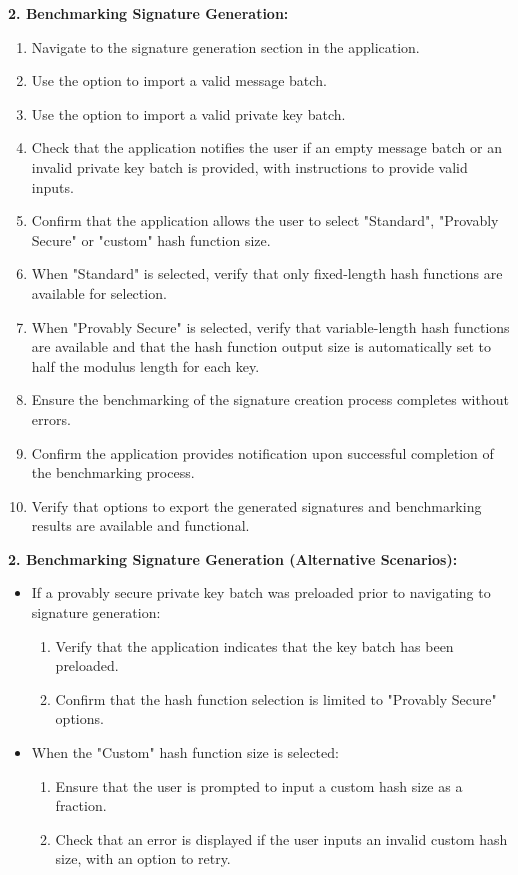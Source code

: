 \documentclass[]{final_report}
\theoremstyle{definition}
\begin{document}
\textbf{2. Benchmarking Signature Generation:}
\begin{enumerate}
    \item Navigate to the signature generation section in the application.
    \item Use the option to import a valid message batch.
    \item Use the option to import a valid private key batch.
    \item Check that the application notifies the user if an empty message batch or an invalid private key batch is provided, with instructions to provide valid inputs.
    \item Confirm that the application allows the user to select "Standard", "Provably Secure" or "custom" hash function size.
    \item When "Standard" is selected, verify that only fixed-length hash functions are available for selection.
    \item When "Provably Secure" is selected, verify that variable-length hash functions are available and that the hash function output size is automatically set to half the modulus length for each key.
    \item Ensure the benchmarking of the signature creation process completes without errors.
    \item Confirm the application provides notification upon successful completion of the benchmarking process.
    \item Verify that options to export the generated signatures and benchmarking results are available and functional.
\end{enumerate}

\textbf{2. Benchmarking Signature Generation (Alternative Scenarios):}

\begin{itemize}
    \item If a provably secure private key batch was preloaded prior to navigating to signature generation:
    \begin{enumerate}
        \item Verify that the application indicates that the key batch has been preloaded.
        \item Confirm that the hash function selection is limited to "Provably Secure" options.
    \end{enumerate}
    \item When the "Custom" hash function size is selected:
    \begin{enumerate}
        \item Ensure that the user is prompted to input a custom hash size as a fraction.
        \item Check that an error is displayed if the user inputs an invalid custom hash size, with an option to retry.
    \end{enumerate}
\end{itemize}
\end{document}
